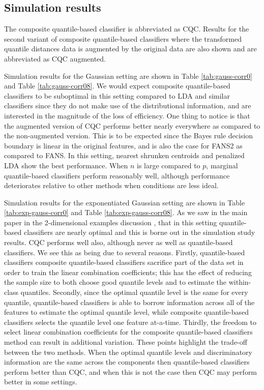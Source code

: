 \documentclass{article}
\begin{document}
\subsection{Simulation results}
\label{sec:simulation-results}

The composite quantile-based classifier is abbreviated as CQC.  Results for the
second variant of composite quantile-based classifiers where the transformed
quantile distances data is augmented by the original data are also shown and are
abbreviated as CQC augmented.

Simulation results for the Gaussian setting are shown in Table
\ref{tab:gauss-corr0} and Table \ref{tab:gauss-corr08}.  We would expect
composite quantile-based classifiers to be suboptimal in this setting compared
to LDA and similar classifiers since they do not make use of the distributional
information, and are interested in the magnitude of the loss of efficiency.  One
thing to notice is that the augmented version of CQC performs better nearly
everywhere as compared to the non-augmented version.  This is to be expected
since the Bayes rule decision boundary is linear in the original features, and
is also the case for FANS2 as compared to FANS.  In this setting, nearest
shrunken centroids and penalized LDA show the best performance.  When $n$ is
large compared to $p$, marginal quantile-based classifiers perform reasonably
well, although performance deteriorates relative to other methods when
conditions are less ideal.

Simulation results for the exponentiated Gaussian setting are shown in Table
\ref{tab:exp-gauss-corr0} and Table \ref{tab:exp-gauss-corr08}.  As we saw in
the main paper in the 2-dimensional examples discussion , that in this setting
quantile-based classifiers are nearly optimal and this is borne out in the
simulation study results.  CQC performs well also, although never as well as
quantile-based classifiers.  We see this as being due to several reasons.
Firstly, quantile-based classifiers composite quantile-based classifiers
sacrifice part of the data set in order to train the linear combination
coefficients; this has the effect of reducing the sample size to both choose
good quantile levels and to estimate the within-class quantiles.  Secondly,
since the optimal quantile level is the same for every quantile, quantile-based
classifiers is able to borrow information across all of the features to estimate
the optimal quantile level, while composite quantile-based classifiers selects
the quantile level one feature at-a-time.  Thirdly, the freedom to select linear
combination coefficients for the composite quantile-based classifiers method can
result in additional variation.  These points highlight the trade-off between
the two methods.  When the optimal quantile levels and discriminatory
information are the same across the components then quantile-based classifiers
perform better than CQC, and when this is not the case then CQC may perform
better in some settings.
\end{document}
